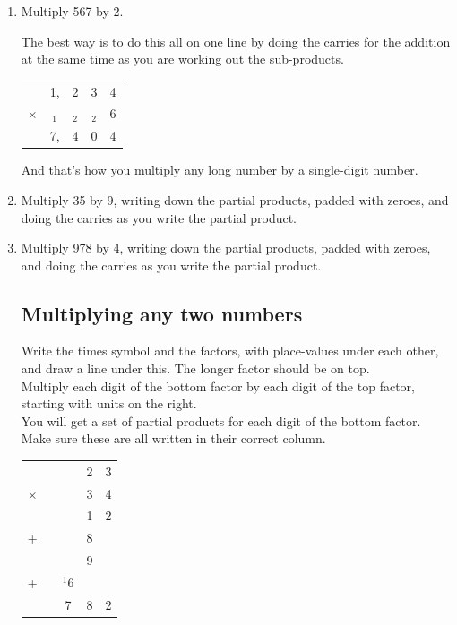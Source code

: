 \documentclass[12pt]{article}
\begin{document}
\begin{enumerate}
\item Multiply 567 by 2.

The best way is to do this all on one line by doing the carries for the addition at the same time as you are working out the sub-products.

\begin{center}
\begin{tabular}{c@{\,}c@{\,}c@{\,}c@{\,}c}
          &1,&2&3&4\\
$\times$ &$_1$&$_2$&$_2$&6\\
\hline
          &7,&4&0&4\\
\hline
\hline
\end{tabular}
\end{center}

And that's how you multiply any long number by a single-digit number.\\

\item Multiply 35 by 9, writing down the partial products, padded with zeroes, and doing the carries as you write the partial product.
\item Multiply 978 by 4, writing down the partial products, padded with zeroes, and doing the carries as you write the partial product.

\newpage

\subsection*{Multiplying any two numbers}

Write the times symbol and the factors, with place-values under each other, and draw a line under this. The longer factor should be on top.\\

Multiply each digit of the bottom factor by each digit of the top factor, starting with units on the right.\\

You will get a set of partial products for each digit of the bottom factor. Make sure these are all written in their correct column.\\

\begin{center}
\begin{tabular}{c@{\,}c@{\,}c@{\,}c@{\,}c}
       & & &2&3\\
$\times$ & & &3&4\\
\hline
       & & &1&2\\
      +& & &8& \\
\hline
       & & &9& \\
  +& &$^{1}$6& & \\
\hline
       & &7&8&2\\
\hline
\hline
\end{tabular}\\
\end{center}


\end{enumerate}
\end{document}
